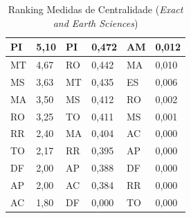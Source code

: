 \begin{table}[H]
\begin{tabular}{|l|l|l|l|l|l|}
		PI                          & 5,10                          & PI                     & 0,472                                    & AM                                  & 0,012                                  \\ \hline
		MT                          & 4,67                          & RO                     & 0,442                                    & MA                                  & 0,010                                  \\ \hline
		MS                          & 3,63                          & MT                     & 0,435                                    & ES                                  & 0,006                                  \\ \hline
		MA                          & 3,50                          & MS                     & 0,412                                    & RO                                  & 0,002                                  \\ \hline
		RO                          & 3,25                          & TO                     & 0,411                                    & MS                                  & 0,001                                  \\ \hline
		RR                          & 2,40                          & MA                     & 0,404                                    & AC                                  & 0,000                                  \\ \hline
		TO                          & 2,17                          & RR                     & 0,395                                    & AP                                  & 0,000                                  \\ \hline
		DF                          & 2,00                          & AP                     & 0,388                                    & DF                                  & 0,000                                  \\ \hline
		AP                          & 2,00                          & AC                     & 0,384                                    & RR                                  & 0,000                                  \\ \hline
		AC                          & 1,80                          & DF                     & 0,000                                    & TO                                  & 0,000                                  \\ \hline
	\end{tabular}
	\caption{Ranking Medidas de Centralidade (\textit{Exact and Earth Sciences})}
	\label{rank-exact}
\end{table}


